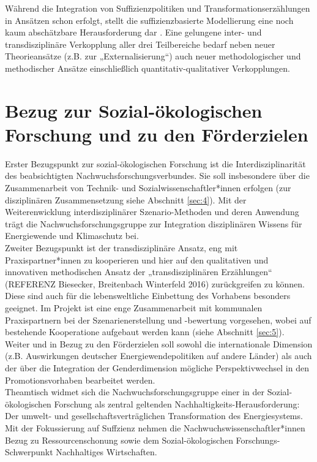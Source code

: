 \documentclass[a4paper,11pt,twoside]{scrartcl}
\begin{document}
Während die Integration von Suffizienzpolitiken und Transformationserzählungen in Ansätzen schon erfolgt, stellt die suffizienzbasierte Modellierung eine noch kaum abschätzbare Herausforderung dar \cite{SAMADI2017}. Eine gelungene inter- und transdisziplinäre Verkopplung aller drei Teilbereiche bedarf neben neuer Theorieansätze (z.B. zur „Externalisierung“) auch neuer methodologischer und methodischer Ansätze einschließlich quantitativ-qualitativer Verkopplungen.

\section{Bezug zur Sozial-ökologischen Forschung und zu den Förderzielen}

Erster Bezugspunkt zur sozial-ökologischen Forschung ist die Interdisziplinarität des beabsichtigten Nachwuchsforschungsverbundes. Sie soll insbesondere über die Zusammenarbeit von Technik- und Sozialwissenschaftler*innen erfolgen (zur disziplinären Zusammensetzung siehe Abschnitt \ref{sec:4}). Mit der Weiterenwicklung interdisziplinärer Szenario-Methoden und deren Anwendung trägt die Nachwuchsforschungsgruppe zur Integration disziplinären Wissens für Energiewende und Klimaschutz bei.\\
Zweiter Bezugspunkt ist der transdisziplinäre Ansatz, eng mit Praxispartner*innen zu kooperieren und hier auf den qualitativen und innovativen methodischen Ansatz der „transdisziplinären Erzählungen“ (REFERENZ Biesecker, Breitenbach Winterfeld 2016) zurückgreifen zu können. Diese sind auch für die lebensweltliche Einbettung des Vorhabens besonders geeignet. Im Projekt ist eine enge Zusammenarbeit mit kommunalen Praxispartnern bei der Szenarienerstellung und -bewertung vorgesehen, wobei auf bestehende Kooperatione aufgebaut werden kann (siehe Abschnitt \ref{sec:5}).\\
Weiter und in Bezug zu den Förderzielen soll sowohl die internationale Dimension (z.B. Auswirkungen deutscher Energiewendepolitiken auf andere Länder) als auch der über die Integration der Genderdimension mögliche Perspektivwechsel in den Promotionsvorhaben bearbeitet werden.\\
Theamtisch widmet sich die Nachwuchsforschungsgruppe einer in der Sozial-ökologischen Forschung als zentral geltenden Nachhaltigkeits-Herausforderung: Der umwelt- und gesellschaftsverträglichen Transformation des Energiesystems. Mit der Fokussierung auf Suffzienz nehmen die Nachwuchswissenschaftler*innen Bezug zu Ressourcenschonung sowie dem Sozial-ökologischen Forschungs-Schwerpunkt Nachhaltiges Wirtschaften.\\
\end{document}
